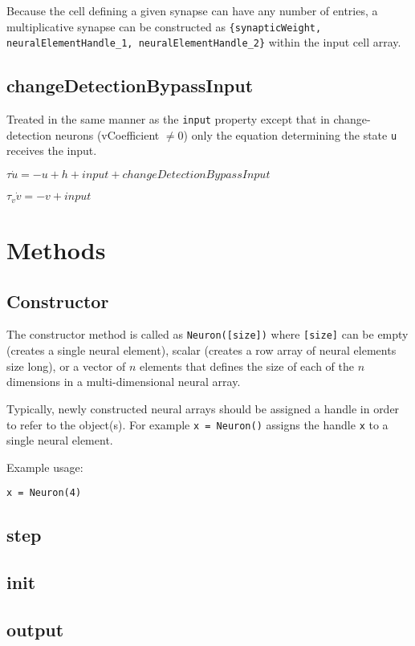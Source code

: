 \documentclass[phd, 12pt, doublespace, online]{fauthesis}
\begin{document}
Because the cell defining a given synapse can have any number of entries, a multiplicative synapse can be constructed as {\tt \{synapticWeight, neuralElementHandle\_1, neuralElementHandle\_2\}} within the input cell array. 

\subsection{changeDetectionBypassInput}

Treated in the same manner as the {\tt input} property except that in change-detection neurons (vCoefficient $\neq 0$) only the equation determining the state {\tt u} receives the input. 

\bigskip
\noindent $ \tau \dot{u} = -u + h + input +  changeDetectionBypassInput$

\noindent $ \tau_v \dot{v} = -v + input $

\section{Methods}

\subsection{Constructor}

The constructor method is called as {\tt Neuron([size])} where {\tt [size]} can be empty (creates a single neural element), scalar (creates a row array of neural elements size long), or a vector of $n$ elements that defines the size of each of the $n$ dimensions in a multi-dimensional neural array. 

Typically, newly constructed neural arrays should be assigned a handle in order to refer to the object(s). For example {\tt x = Neuron()} assigns the handle {\tt x} to a single neural element. 

Example usage:

{\tt x = Neuron(4)}



\subsection{step}
\subsection{init}
\subsection{output}
\end{document}
